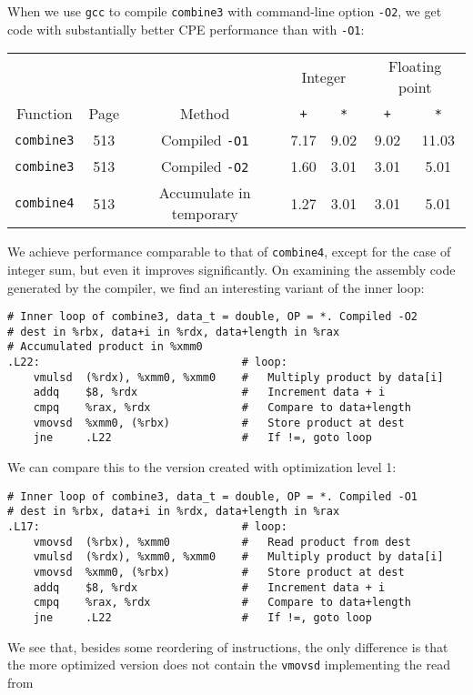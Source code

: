 \documentclass[12pt]{article}
\newenvironment{ex}[2][Exercise]{\begin{trivlist}
		\item[\hskip \labelsep {\bfseries #1}\hskip \labelsep {\bfseries #2.}]}{\end{trivlist}}
\begin{document}
\begin{ex}{5.4}
	When we use \texttt{gcc} to compile \texttt{combine3} with command-line option \texttt{-O2},
	we get code with substantially better CPE performance than with \texttt{-O1}:
	\begin{center}
		\begin{tabular}{ccccccc}
			{} & {} & {} & \multicolumn{2}{c}{Integer} & \multicolumn{2}{c}{Floating point}\\
			Function & Page & Method & \texttt{+} & \texttt{*} & \texttt{+} & \texttt{*}\\
			\hline
			\texttt{combine3} & 513 & Compiled \texttt{-O1} & 7.17 & 9.02 & 9.02 & 11.03\\
			\texttt{combine3} & 513 & Compiled \texttt{-O2} & 1.60 & 3.01 & 3.01 & 5.01\\
			\texttt{combine4} & 513 & Accumulate in temporary & 1.27 & 3.01 & 3.01 & 5.01\\
		\end{tabular}
	\end{center}
	We achieve performance comparable to that of \texttt{combine4}, except for the case of
	integer sum, but even it improves significantly. On examining the assembly code generated
	by the compiler, we find an interesting variant of the inner loop:
	\begin{lstlisting}[language={}]
# Inner loop of combine3, data_t = double, OP = *. Compiled -O2
# dest in %rbx, data+i in %rdx, data+length in %rax
# Accumulated product in %xmm0
.L22:								# loop:
	vmulsd	(%rdx), %xmm0, %xmm0	#	Multiply product by data[i]
	addq	$8, %rdx				# 	Increment data + i
	cmpq	%rax, %rdx				#	Compare to data+length
	vmovsd	%xmm0, (%rbx)			# 	Store product at dest
	jne		.L22					#	If !=, goto loop
	\end{lstlisting}
	We can compare this to the version created with optimization level 1:
		\begin{lstlisting}[language={}]
# Inner loop of combine3, data_t = double, OP = *. Compiled -O1
# dest in %rbx, data+i in %rdx, data+length in %rax
.L17:								# loop:
	vmovsd	(%rbx), %xmm0			#	Read product from dest
	vmulsd	(%rdx), %xmm0, %xmm0	#	Multiply product by data[i]
	vmovsd	%xmm0, (%rbx)			#	Store product at dest
	addq	$8, %rdx				# 	Increment data + i
	cmpq	%rax, %rdx				#	Compare to data+length
	jne		.L22					#	If !=, goto loop
	\end{lstlisting}
	We see that, besides some reordering of instructions, the only difference is that the
	more optimized version does not contain the \texttt{vmovsd} implementing the read from

\end{ex}
\end{document}
